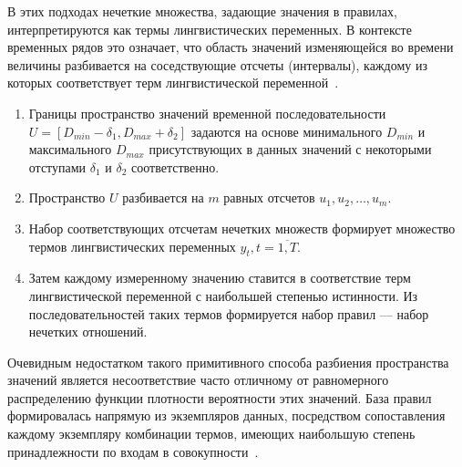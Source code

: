 В этих подходах нечеткие множества, задающие значения в правилах, интерпретируются как термы лингвистических переменных. В контексте временных рядов это означает, что область значений изменяющейся во времени величины разбивается на соседствующие отсчеты (интервалы), каждому из которых соответствует терм лингвистической переменной~\cite{RyzhovFuzzySets,Leonenkov2005FuzzyModeling,Pegat2009FuzzyModeling}.

\begin{enumerate}
	\item Границы пространство значений временной последовательности $U = [D_{min} - \delta_1, D_{max} + \delta_2]$ задаются на основе минимального $D_{min}$ и максимального $D_{max}$ присутствующих в данных значений с некоторыми отступами $\delta_1$ и $\delta_2$ соответственно.
	\item Пространство $U$ разбивается на $m$ равных отсчетов $u_1, u_2, \dots, u_m$.
	\item Набор соответствующих отсчетам нечетких множеств формирует множество термов лингвистических переменных $y_t, t=\overline{1, T}$.
	\item Затем каждому измеренному значению ставится в соответствие терм лингвистической переменной с наибольшей степенью истинности. Из последовательностей таких термов формируется набор правил --- набор нечетких отношений.
\end{enumerate}

Очевидным недостатком такого примитивного способа разбиения пространства значений является несоответствие часто отличному от равномерного распределению функции плотности вероятности этих значений. База правил формировалась напрямую из экземпляров данных, посредством сопоставления каждому экземпляру комбинации термов, имеющих наибольшую степень принадлежности по входам в совокупности~\cite{Chellai2022,YarushevNeuroFuzzyTS}.

